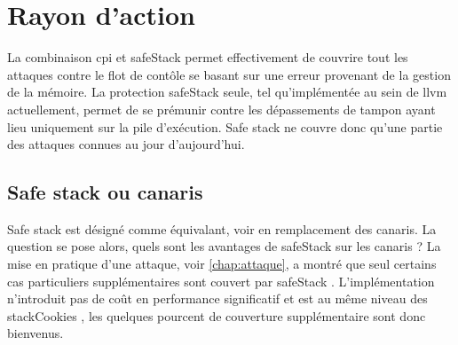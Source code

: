 \section{Rayon d'action}


La combinaison \gls{cpi} et \og \gls{safeStack} \fg permet effectivement de couvrire tout les attaques contre le flot de contôle se basant sur une erreur provenant de la gestion de la mémoire. La protection \og \gls{safeStack} \fg seule, tel qu'implémentée au sein de \gls{llvm} actuellement, permet de se prémunir contre les dépassements de tampon ayant lieu uniquement sur la pile d'exécution. \og Safe stack \fg ne couvre donc qu'une partie des attaques connues au jour d'aujourd'hui.

\subsection{\og Safe stack \fg ou canaris}

\og Safe stack \fg est désigné comme équivalant, voir en remplacement des canaris. La question se pose alors, quels sont les avantages de \og \gls{safeStack} \fg sur les canaris ? La mise en pratique d'une attaque, voir \autoref{chap:attaque}, a montré que seul certains cas particuliers supplémentaires sont couvert par \og \gls{safeStack} \fg. L'implémentation n'introduit pas de coût en performance significatif et est au même niveau des \og \gls{stackCookies} \fg, les quelques pourcent de couverture supplémentaire sont donc bienvenus.
